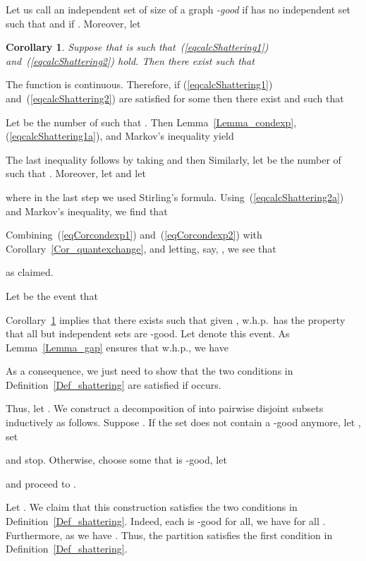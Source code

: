 \documentclass[a4paper,10pt]{article}
\makeatletter
\newtheorem{corollary}{Corollary}\renewcommand{\thecorollary}{\arabic{corollary}}
\newenvironment{proof}{\noindent{\bf Proof\@:}}{\hfill \\}
\newcommand{\whp}{w.h.p.}
\newcommand\Lem{Lemma}
\newcommand\Prop{Proposition}
\newcommand\Cor{Corollary}
\makeatother
\begin{document}
Let us call an independent set  of size  of a graph 
\emph{-good} if  has no independent set 
such that  and if
		.
Moreover, let
	

\begin{corollary}\label{Cor_condexp}
Suppose that  is such that~(\ref{eqcalcShattering1}) and~(\ref{eqcalcShattering2}) hold.
Then there exist  such that
	
\end{corollary}
\begin{proof}
The function  is continuous.
Therefore, if (\ref{eqcalcShattering1}) and~(\ref{eqcalcShattering2}) 
are satisfied for some  then there exist  and  such that
	
Let  be the number of  such that .
Then \Lem~\ref{Lemma_condexp}, (\ref{eqcalcShattering1a}), and Markov's
inequality yield
	
The last inequality follows by taking 
and then 
Similarly, let  be the number of 
such that . Moreover, let  and let

where in the last step we used Stirling's formula.
Using~(\ref{eqcalcShattering2a}) and Markov's inequality, we find that
	
Combining~(\ref{eqCorcondexp1}) and~(\ref{eqCorcondexp2}) with 
\Cor~\ref{Cor_quantexchange}, and letting, say, , we see that
	
as claimed.
\end{proof}

\noindent{\bf Proof of \Prop~\ref{Prop_calcShattering}:}
Let  be the event that
	
\Cor~\ref{Cor_condexp} implies that there exists 
such that given , 	\whp\  has the property that all
but  independent sets 
are -good. Let  denote this event.
As \Lem~\ref{Lemma_gap} ensures that  \whp, 
we have
		
As a consequence, we just need to show that
	the two conditions in Definition~\ref{Def_shattering} are satisfied if  occurs.

Thus, let . We construct a decomposition of  
into pairwise disjoint subsets  inductively
as follows. Suppose .
If the set  does not contain 
a -good anymore, let , set
	
and stop.
Otherwise, choose some  that is -good, let
	
and proceed to .

Let . We claim that this construction satisfies the two
conditions in Definition~\ref{Def_shattering}. Indeed, each  is
-good for all, we have 	 
for all . Furthermore, as  we have 
.
Thus, the partition  satisfies the first condition
in Definition~\ref{Def_shattering}.
\end{document}
